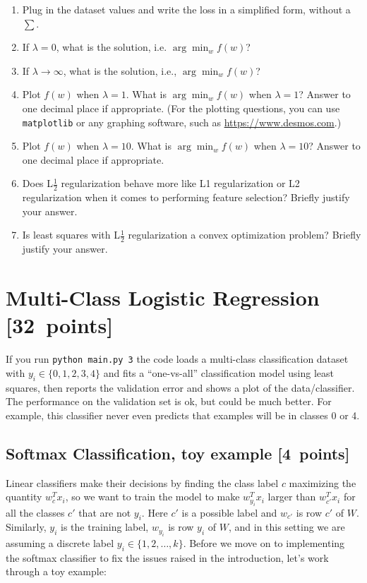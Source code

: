 \documentclass{article}
\newcommand{\blu}[1]{{\textcolor{blu}{#1}}}
\let\ask\blu
\newcommand\pts[1]{\textcolor{pointscolour}{[#1~points]}}
\begin{document}
\begin{enumerate}
\item \ask{Plug in the dataset values and write the loss in a simplified form, without a $\sum$.}
\item \ask{If $\lambda=0$, what is the solution, i.e. $\arg \min_w f(w)$?}
\item \ask{If $\lambda\rightarrow \infty$, what is the solution, i.e., $\arg \min_w f(w)$?}
\item \ask{Plot $f(w)$ when $\lambda = 1$. What is $\arg \min_w f(w)$ when $\lambda=1$?} Answer to one decimal place if appropriate. (For the plotting questions, you can use \texttt{matplotlib} or any graphing software, such as \url{https://www.desmos.com}.)
\item \ask{Plot $f(w)$ when $\lambda = 10$. What is $\arg \min_w f(w)$ when $\lambda=10$?} Answer to one decimal place if appropriate.
\item \ask{Does L$\frac12$ regularization behave more like L1 regularization or L2 regularization
when it comes to performing feature selection?} Briefly justify your answer.
\item \ask{Is least squares with L$\frac12$ regularization
a convex optimization problem?} Briefly justify your answer.
\end{enumerate}




\clearpage
\section{Multi-Class Logistic Regression \pts{32}}

If you run \verb|python main.py 3| the code loads a multi-class
classification dataset with $y_i \in \{0,1,2,3,4\}$ and fits a ``one-vs-all'' classification
model using least squares, then reports the validation error and shows a plot of the data/classifier.
The performance on the validation set is ok, but could be much better.
For example, this classifier never even predicts that examples will be in classes 0 or 4.


\subsection{Softmax Classification, toy example \pts{4}}

Linear classifiers make their decisions by finding the class label $c$ maximizing the quantity $w_c^Tx_i$, so we want to train the model to make $w_{y_i}^Tx_i$ larger than $w_{c'}^Tx_i$ for all the classes $c'$ that are not $y_i$.
Here $c'$ is a possible label and $w_{c'}$ is row $c'$ of $W$. Similarly, $y_i$ is the training label, $w_{y_i}$ is row $y_i$ of $W$, and in this setting we are assuming a discrete label $y_i \in \{1,2,\dots,k\}$. Before we move on to implementing the softmax classifier to fix the issues raised in the introduction, let's work through a toy example:
\end{document}
